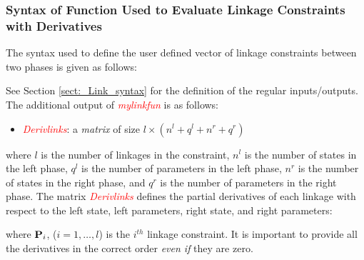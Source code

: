 \documentclass[10pt,final]{report}
\newcommand{\slred}[1]{\textcolor{red}{\sl #1}}
\begin{document}
\subsubsection{Syntax of Function Used to Evaluate Linkage Constraints with Derivatives}

The syntax used to define the user defined vector of linkage
constraints between two phases is given as follows:
\begin{center}
\end{center}
See Section \ref{sect:_Link_syntax} for the definition of the regular inputs/outputs. The additional output of \slred{mylinkfun} is as follows:
\begin{itemize}
  \item \slred{Derivlinks}: a {\em matrix} of size $l\times (n^l+q^l+n^r+q^r)$
\end{itemize}
where $l$ is the number of linkages in the constraint, $n^l$ is the number of states in the left phase, $q^l$ is the number of parameters in the left phase, $n^r$ is the number of states in the right phase, and $q^r$ is the number of parameters in the right phase. The matrix \slred{Derivlinks} defines the partial derivatives of each linkage with respect to the left state, left parameters, right state, and right parameters:
\begin{center}
\end{center}
where $\bfP_i$, ($i = 1,\ldots,l$) is the $i^{th}$ linkage constraint. It is important to provide all the derivatives in the correct order {\em even if} they are zero.
\end{document}
